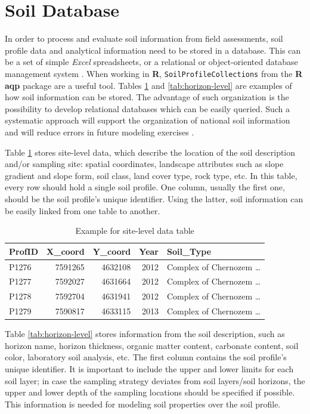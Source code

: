 \documentclass[10pt,b5paper,]{book}
\theoremstyle{definition}
\theoremstyle{definition}
\theoremstyle{definition}
\theoremstyle{remark}
\begin{document}
\hypertarget{soil-database}{%
\section{Soil Database}\label{soil-database}}

In order to process and evaluate soil information from field
assessments, soil profile data and analytical information need to be
stored in a database. This can be a set of simple \emph{Excel}
spreadsheets, or a relational or object-oriented database management
system \citep{baritz2008environmental}. When working in \textbf{R},
\texttt{SoilProfileCollections} from the \textbf{R} \textbf{aqp} package
are a useful tool. Tables \ref{tab:site-level} and
\ref{tab:horizon-level} are examples of how soil information can be
stored. The advantage of such organization is the possibility to develop
relational databases which can be easily queried. Such a systematic
approach will support the organization of national soil information and
will reduce errors in future modeling exercises
\citep{baritz2008environmental}.

Table \ref{tab:site-level} stores site-level data, which describe the
location of the soil description and/or sampling site: spatial
coordinates, landscape attributes such as slope gradient and slope form,
soil class, land cover type, rock type, etc. In this table, every row
should hold a single soil profile. One column, usually the first one,
should be the soil profile's unique identifier. Using the latter, soil
information can be easily linked from one table to another.

\begin{table}

\caption{\label{tab:site-level}Example for site-level data table}
\centering
\begin{tabular}[t]{lrrrl}
\toprule
ProfID & X\_coord & Y\_coord & Year & Soil\_Type\\
\midrule
P1276 & 7591265 & 4632108 & 2012 & Complex of Chernozem …\\
P1277 & 7592027 & 4631664 & 2012 & Complex of Chernozem …\\
P1278 & 7592704 & 4631941 & 2012 & Complex of Chernozem …\\
P1279 & 7590817 & 4633115 & 2013 & Complex of Chernozem …\\
\bottomrule
\end{tabular}
\end{table}

Table \ref{tab:horizon-level} stores information from the soil
description, such as horizon name, horizon thickness, organic matter
content, carbonate content, soil color, laboratory soil analysis, etc.
The first column contains the soil profile's unique identifier. It is
important to include the upper and lower limits for each soil layer; in
case the sampling strategy deviates from soil layers/soil horizons, the
upper and lower depth of the sampling locations should be specified if
possible. This information is needed for modeling soil properties over
the soil profile.
\end{document}
